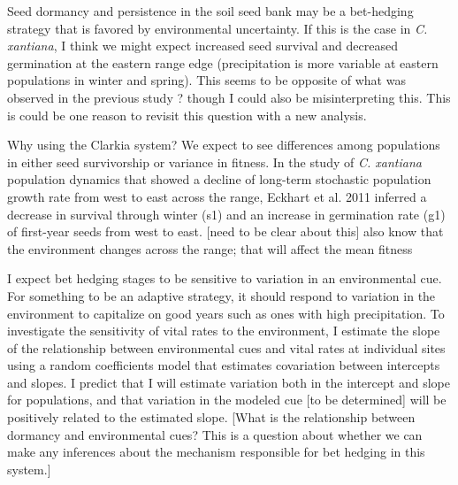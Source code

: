 \documentclass[12pt, oneside, titlepage]{article}   	%
\begin{document}
Seed dormancy and persistence in the soil seed bank may be a bet-hedging strategy that is favored by environmental uncertainty. If this is the case in \textit{C. xantiana}, I think we might expect increased seed survival and decreased germination at the eastern range edge (precipitation is more variable at eastern populations in winter and spring). This seems to be opposite of what was observed in the previous study ? though I could also be misinterpreting this. This is could be one reason to revisit this question with a new analysis. 


Why using the Clarkia system? We expect to see differences among populations in either seed survivorship or variance in fitness. In the study of \textit{C. xantiana} population dynamics that showed a decline of long-term stochastic population growth rate from west to east across the range, Eckhart et al. 2011 inferred a decrease in survival through winter (s1) and an increase in germination rate (g1) of first-year seeds from west to east. [need to be clear about this] also know that the environment changes across the range; that will affect the mean fitness

I expect bet hedging stages to be sensitive to variation in an environmental cue. For something to be an adaptive strategy, it should respond to variation in the environment to capitalize on good years such as ones with high precipitation. To investigate the sensitivity of vital rates to the environment, I estimate the slope of the relationship between environmental cues and vital rates at individual sites using a random coefficients model that estimates covariation between intercepts and slopes. I predict that I will estimate variation both in the intercept and slope for populations, and that variation in the modeled cue [to be determined] will be positively related to the estimated slope. [What is the relationship between dormancy and environmental cues? This is a question about whether we can make any inferences about the mechanism responsible for bet hedging in this system.]
\end{document}
